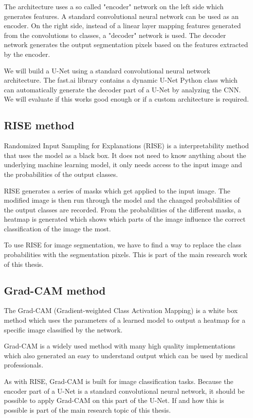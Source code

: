 The architecture uses a so called "encoder" network on the left side which generates features. A standard convolutional neural network can be used as an encoder. On the right side, instead of a linear layer mapping features generated from the convolutions to classes, a "decoder" network is used. The decoder network generates the output segmentation pixels based on the features extracted by the encoder.

We will build a U-Net using a standard convolutional neural network architecture. The fast.ai library contains a dynamic U-Net Python class which can automatically generate the decoder part of a U-Net by analyzing the CNN. We will evaluate if this works good enough or if a custom architecture is required.

\subsection{RISE method}
Randomized Input Sampling for Explanations (RISE) is a interpretability method that uses the model as a black box. It does not need to know anything about the underlying machine learning model, it only needs access to the input image and the probabilities of the output classes.

RISE generates a series of masks which get applied to the input image. The modified image is then run through the model and the changed probabilities of the output classes are recorded. From the probabilities of the different masks, a heatmap is generated which shows which parts of the image influence the correct classification of the image the most.

To use RISE for image segmentation, we have to find a way to replace the class probabilities with the segmentation pixels. This is part of the main research work of this thesis.


\subsection{Grad-CAM method}
The Grad-CAM \cite{selvaraju2017grad} (Gradient-weighted Class Activation Mapping) is a white box method which uses the parameters of a learned model to output a heatmap for a specific image classified by the network.

Grad-CAM is a widely used method with many high quality implementations which also generated an easy to understand output which can be used by medical professionals.

As with RISE, Grad-CAM is built for image classification tasks. Because the encoder part of a U-Net is a standard convolutional neural network, it should be possible to apply Grad-CAM on this part of the U-Net. If and how this is possible is part of the main research topic of this thesis.


